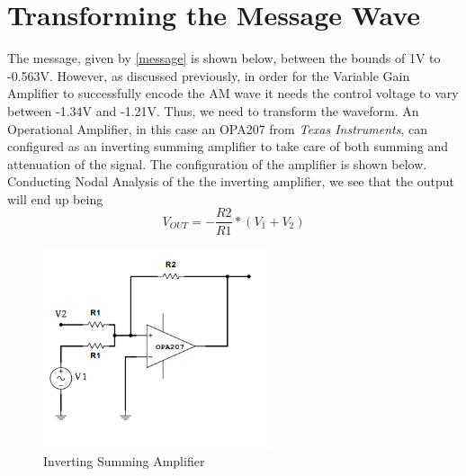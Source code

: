 \section{Transforming the Message Wave}

The message, given by \eqref{message} is shown below, between the bounds of 1V to -0.563V. However, as discussed previously, in order for the Variable Gain Amplifier to successfully encode the AM wave it needs the control voltage to vary between -1.34V and -1.21V. Thus, we need to transform the waveform. An Operational Amplifier, in this case an OPA207 from \textit{Texas Instruments}, can configured as an inverting summing amplifier to take care of both summing and attenuation of the signal. The configuration of the amplifier is shown below. Conducting Nodal Analysis of the the inverting amplifier, we see that the output will end up being
\begin{equation}\label{invertingAmp}
    V_{OUT} = -\frac{R2}{R1} * (V_1 + V_2)
\end{equation}

\begin{figure}[H]
    \centering
    \includegraphics[width = 0.6\textwidth]{Images/OPA207.png}
    \caption{Inverting Summing Amplifier}
    \label{fig:Inverting Summing Amplifier}
\end{figure}

